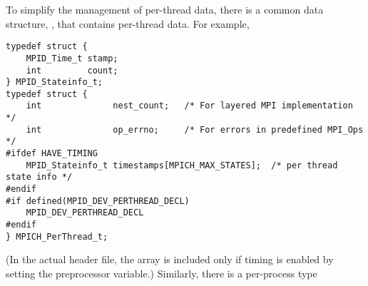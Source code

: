 \documentclass{article}
\begin{document}
To simplify the management of per-thread data, there is a common data
structure, , that contains per-thread data.
For example,
% 
\begin{verbatim}
typedef struct {
    MPID_Time_t stamp;
    int         count;
} MPID_Stateinfo_t;
typedef struct {
    int              nest_count;   /* For layered MPI implementation */
    int              op_errno;     /* For errors in predefined MPI_Ops */
#ifdef HAVE_TIMING
    MPID_Stateinfo_t timestamps[MPICH_MAX_STATES];  /* per thread state info */
#endif
#if defined(MPID_DEV_PERTHREAD_DECL)
    MPID_DEV_PERTHREAD_DECL
#endif    
} MPICH_PerThread_t;
\end{verbatim}
(In the actual  header file, the 
array is included only if timing is enabled by setting the
 preprocessor variable.)
Similarly, there is a per-process type
\end{document}
